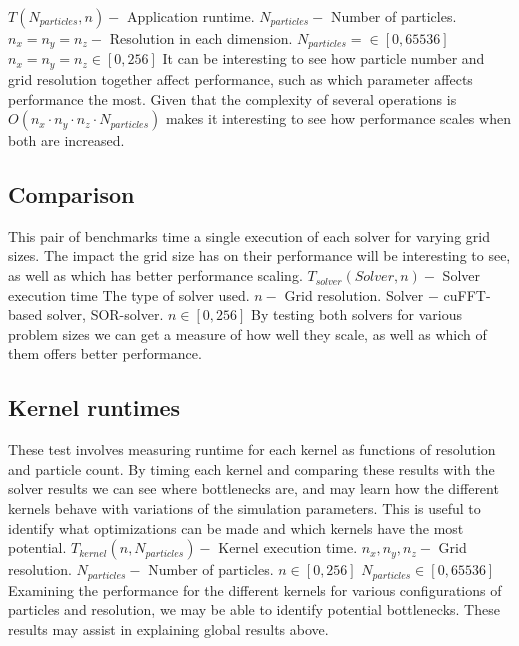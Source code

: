 	{$T(N_{particles}, n) -$ Application runtime.}
	{$N_{particles} -$ Number of particles.\newline
	  $n_x = n_y = n_z -$ Resolution in each dimension.}
	{$N_{particles} = \in [0, 65536]$\newline
	  $n_x = n_y = n_z \in [0, 256]$}
	{It can be interesting to see how particle number and grid resolution together affect performance, such as which
	  parameter affects performance the most. Given that the complexity of several operations is $O(n_x\cdot n_y \cdot n_z \cdot N_{particles})$
	  makes it interesting to see how performance scales when both are increased.}

\subsection{Comparison}
This pair of benchmarks time a single execution of each solver for varying grid sizes. The impact the grid size has on
their performance will be interesting to see, as well as which has better performance scaling.
	{$T_{solver}(Solver, n) -$ Solver execution time}
	{The type of solver used.\newline
	  $n -$ Grid resolution.}
	{Solver $-$ cuFFT-based solver, SOR-solver.\newline
	  $n \in [0, 256]$}
	{By testing both solvers for various problem sizes we can get a measure of how well they scale, as well as which of them
	  offers better performance.}
	  
\subsection{Kernel runtimes}
These test involves measuring runtime for each kernel as functions of resolution and particle count. By timing each kernel
and comparing these results with the solver results we can see where bottlenecks are, and may learn how the different
kernels behave with variations of the simulation parameters. This is useful to identify what optimizations can be made
and which kernels have the most potential.
	{$T_{kernel}(n, N_{particles}) -$ Kernel execution time.}
	{$n_x, n_y, n_z -$ Grid resolution.\newline
	  $N_{particles} -$ Number of particles.}
	{$n \in [0, 256]$\newline
	  $N_{particles} \in [0, 65536]$}
	{Examining the performance for the different kernels for various configurations of particles and resolution, we may be
	able to identify potential bottlenecks. These results may assist in explaining global results above.}

